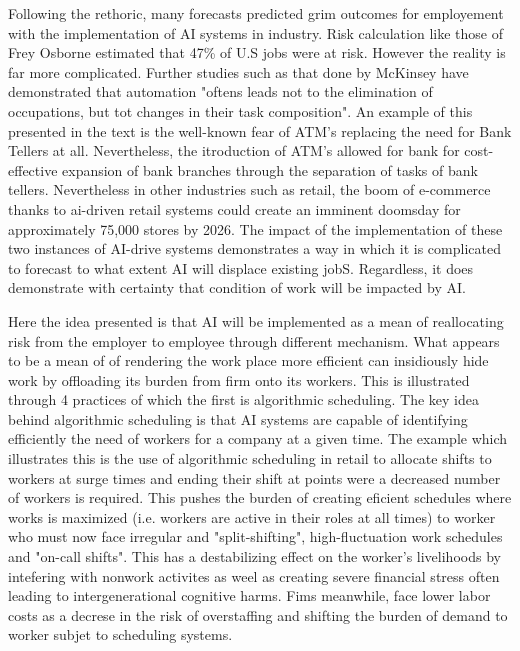 \documentclass[a4paper,11pt,oneside]{report}
\begin{document}
Following the rethoric, many forecasts predicted grim outcomes for employement with the implementation of AI systems in industry. Risk calculation like those of Frey Osborne estimated that 47\% of U.S jobs were at risk. However the reality is far more complicated. Further studies such as that done by McKinsey have demonstrated that automation "oftens leads not to the elimination of occupations, but tot changes in their task composition". An example of this presented in the text is the well-known fear of ATM's replacing the need for Bank Tellers at all. Nevertheless, the itroduction of ATM's allowed for bank for cost-effective expansion of bank branches through the separation of tasks of bank tellers. Nevertheless in other industries such as retail, the boom of e-commerce thanks to ai-driven retail systems could create an imminent doomsday for approximately 75,000 stores by 2026. The impact of the implementation of these two instances of AI-drive systems demonstrates a way in which it is complicated to forecast to what extent AI will displace existing jobS. Regardless, it does demonstrate with certainty that condition of work will be impacted by AI.

Here the idea presented is that AI will be implemented as a mean of reallocating risk from the employer to employee through different mechanism. What appears to be a mean of of rendering the work place more efficient can insidiously hide work by offloading its burden from firm onto its workers. This is illustrated through 4 practices of which the first is algorithmic scheduling. The key idea behind algorithmic scheduling is that AI systems are capable of identifying efficiently the need of workers for a company at a given time. The example which illustrates this is the use of algorithmic scheduling in retail to allocate shifts to workers at surge times and ending their shift at points were a decreased number of workers is required. This pushes the burden of creating eficient schedules where works is maximized (i.e. workers are active in their roles at all times) to worker who must now face irregular and "split-shifting", high-fluctuation work schedules and "on-call shifts". This has a destabilizing effect on the worker's livelihoods by intefering with nonwork activites as weel as creating severe financial stress often leading to intergenerational cognitive harms. Fims meanwhile, face lower labor costs as a decrese in the risk of overstaffing and shifting the burden of demand to worker subjet to scheduling systems.
\end{document}
